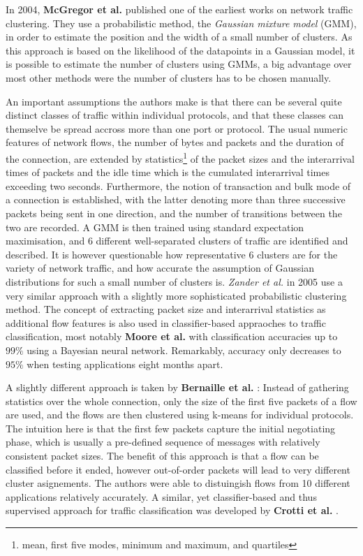 \documentclass[a4paper,12pt,twoside]{report}
\begin{document}
In 2004, \textbf{McGregor et al.} \cite{mcgregor2004flow} published one of the earliest works on network traffic clustering. They use a probabilistic method, the \textit{Gaussian mixture model} (GMM), in order to estimate the position and the width of a small number of clusters. As this approach is based on the likelihood of the datapoints in a Gaussian model, it is possible to estimate the number of clusters using GMMs, a big advantage over most other methods were the number of clusters has to be chosen manually. 

An important assumptions the authors make is that there can be several quite distinct classes of traffic within individual protocols, and that these classes can themselve be spread accross more than one port or protocol. The usual numeric features of network flows, the number of bytes and packets and the duration of the connection, are extended by statistics\footnote{mean, first five modes, minimum and maximum, and quartiles} of the packet sizes and the interarrival times of packets and the idle time which is the cumulated interarrival times exceeding two seconds. Furthermore, the notion of transaction and bulk mode of a connection is established, with the latter denoting more than three successive packets being sent in one direction, and the number of transitions between the two are recorded. A GMM is then trained using standard expectation maximisation, and 6 different well-separated clusters of traffic are identified and described. It is however questionable how representative 6 clusters are for the variety of network traffic, and how accurate the assumption of Gaussian distributions for such a small number of clusters is. \textit{Zander et al.} \cite{zander2005automated} in 2005 use a very similar approach with a slightly more sophisticated probabilistic clustering method. The concept of extracting packet size and interarrival statistics as additional flow features is also used in classifier-based appraoches to traffic classification, most notably \textbf{Moore et al.} \cite{auld2007bayesian,moore2005internet} with classification accuracies up to $99\%$ using a Bayesian neural network. Remarkably, accuracy only decreases to $95\%$ when testing applications eight months apart.

A slightly different approach is taken by \textbf{Bernaille et al.} \cite{bernaille2006traffic}: Instead of gathering statistics over the whole connection, only the size of the first five packets of a flow are used, and the flows are then clustered using k-means for individual protocols. The intuition here is that the first few packets capture the initial negotiating phase, which is usually a pre-defined sequence of messages with relatively consistent packet sizes. The benefit of this approach is that a flow can be classified before it ended, however out-of-order packets will lead to very different cluster asignements. The authors were able to distuingish flows from 10 different applications relatively accurately. A similar, yet classifier-based and thus supervised approach for traffic classification was developed by \textbf{Crotti et al.} \cite{crotti2007traffic}.
\end{document}
